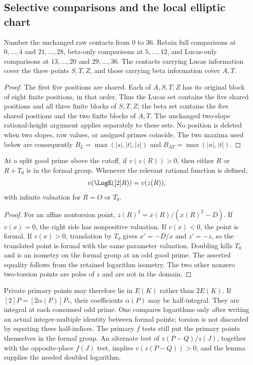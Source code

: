\subsection{Selective comparisons and the local elliptic chart}

\begin{lemma}\label{lem:quartic-three-mode-coverage}
Number the unchanged raw contacts from $0$ to $36$. Retain full comparisons
at $0,\ldots,4$ and $21,\ldots,28$, beta-only comparisons at
$5,\ldots,12$, and Lucas-only comparisons at $13,\ldots,20$ and
$29,\ldots,36$. The contacts carrying Lucas information cover the three
points $S,T,Z$, and those carrying beta information cover $A,T$.
\end{lemma}
\begin{proof}
The first five positions are shared. Each of $A,S,T,Z$ has its original
block of eight finite positions, in that order. Thus the Lucas set contains
the five shared positions and all three finite blocks of $S,T,Z$; the beta
set contains the five shared positions and the two finite blocks of $A,T$.
The unchanged two-slope rational-height argument applies separately to
these sets. No position is deleted when two slopes, raw values, or assigned
primes coincide. The two maxima used below are consequently
$B_L=\max(|s|,|t|,|z|)$ and $B_{AT}=\max(|n|,|t|)$.
\end{proof}

\begin{lemma}
\label{lem:quartic-doubled-private-comparison}
At a split good prime above the cutoff, if $v(z(R))>0$, then either $R$ or
$R+T_0$ is in the formal group. Whenever the relevant rational function is
defined,
\[
 v(\LogE([2]R))=v(z(R)),
\]
with infinite valuation for $R=O$ or $T_0$.
\end{lemma}
\begin{proof}
For an affine nontorsion point,
$z(R)^2=x(R)/(x(R)^2-D)$. If $v(x)=0$, the right side has nonpositive
valuation. If $v(x)<0$, the point is formal. If $v(x)>0$, translation by
$T_0$ gives $x'=-D/x$ and $z'=-z$, so the translated point is formal with
the same parameter valuation. Doubling kills $T_0$ and is an isometry on
the formal group at an odd good prime. The asserted equality follows from
the retained logarithm isometry. The two other nonzero two-torsion points
are poles of $z$ and are not in the domain.
\end{proof}

Private primary points may therefore lie in $E(K)$ rather than $2E(K)$.
If $[2]P=[2\alpha(P)]P_*$, their coefficients $\alpha(P)$ may be
half-integral. They are integral at each consumed odd prime. One compares
logarithms only after writing an actual integer-multiple identity between
formal points; torsion is not discarded by equating these half-indices.
The primary $f$ tests still put the primary points themselves in the
formal group. An alternate test of
$z(P-Q)/z(J)$, together with the opposite-place $f(J)$ test, implies
$v(z(P-Q))>0$, and the lemma supplies the needed doubled logarithm.

